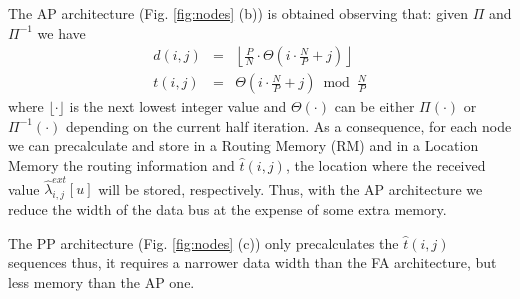 \documentclass[10pt,twocolumn,journal]{IEEEtran}
\begin{document}
The AP architecture (Fig. \ref{fig:nodes} (b)) is obtained observing that: given $\Pi$ and $\Pi^{-1}$ we have
\begin{eqnarray}
d(i,j) & = & \left\lfloor \frac{P}{N} \cdot \Theta \left( i\cdot \frac{N}{P}+j \right) \right\rfloor \\
t(i,j) & = & \Theta\left( i\cdot \frac{N}{P}+j \right) \bmod \frac{N}{P}
\end{eqnarray}
where $\lfloor \cdot \rfloor$ is the next lowest integer value and 
$\Theta(\cdot)$ can be either $\Pi(\cdot)$ or $\Pi^{-1}(\cdot)$ depending on the current half iteration.
As a consequence, for each node we can precalculate and store in a Routing Memory (RM) and in a Location Memory 
the routing information and $\hat{t}(i,j)$, the location where the received value $\hat{\lambda}^{ext}_{i,j}[u]$ 
will be stored, respectively. Thus, with the AP architecture we reduce the width of the data bus at the expense of 
some extra memory. 

The PP architecture (Fig. \ref{fig:nodes} (c)) only precalculates the $\hat{t}(i,j)$ sequences thus, it requires a narrower data width 
than the FA architecture, but less memory than the AP one.
\end{document}
